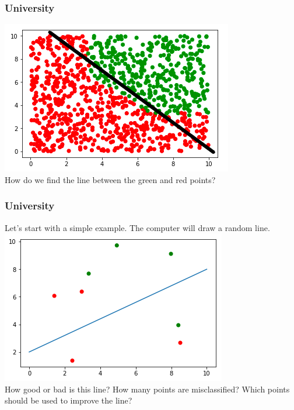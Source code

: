 \begin{frame}[fragile]
  \frametitle{University}
  \includegraphics[scale=0.4]{img/uni_data_2}\\
  \vspace{3mm}
  How do we find the line between the green and red points?
\end{frame}

\begin{frame}[fragile]
  \frametitle{University}
  Let's start with a simple example. The computer will draw a random line.\\
  \vspace{3mm}
  \includegraphics[scale=0.4]{img/uni_data_3}\\
  \vspace{3mm}
  How good or bad is this line? How many points are misclassified? Which points
  should be used to improve the line?
\end{frame}

